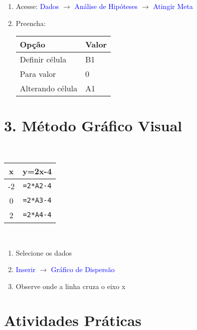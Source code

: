 \documentclass[11pt]{article}
\begin{document}
\begin{multicols}{2}
\begin{enumerate}
    \item Acesse: \textcolor{blue}{Dados} $\rightarrow$ \textcolor{blue}{Análise de Hipóteses} $\rightarrow$ \textcolor{blue}{Atingir Meta}
    
    \item Preencha:
    \begin{tabular}{|l|l|}
    \hline
    \textbf{Opção} & \textbf{Valor} \\ \hline
    Definir célula & B1 \\ \hline
    Para valor & 0 \\ \hline
    Alterando célula & A1 \\ \hline
    \end{tabular}
\end{enumerate}

\section*{3. Método Gráfico Visual}
\
\begin{tabular}{|c|c|}
\hline
\textbf{x} & \textbf{y=2x-4} \\ \hline
-2 & \texttt{=2*A2-4} \\ \hline
0 & \texttt{=2*A3-4} \\ \hline
2 & \texttt{=2*A4-4} \\ \hline
\end{tabular}

\
\begin{enumerate}
    \item Selecione os dados
    \item \textcolor{blue}{Inserir} $\rightarrow$ \textcolor{blue}{Gráfico de Dispersão}
    \item Observe onde a linha cruza o eixo x
\end{enumerate}

\begin{center}
\end{center}

\section*{Atividades Práticas}


\end{multicols}
\end{document}
